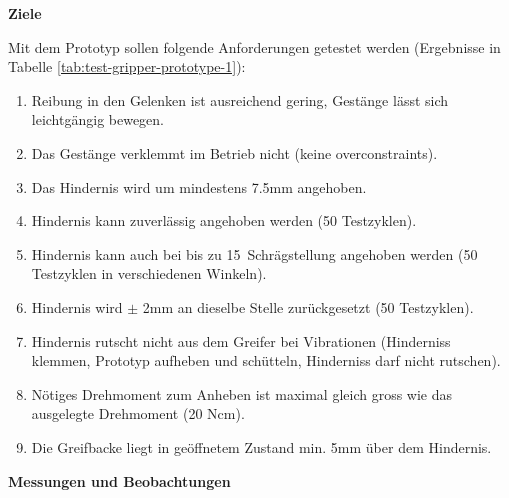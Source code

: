 \textbf{Ziele}

Mit dem Prototyp sollen folgende Anforderungen getestet werden (Ergebnisse in Tabelle \ref{tab:test-gripper-prototype-1}):
\begin{enumerate}
    \item Reibung in den Gelenken ist ausreichend gering, Gestänge lässt sich leichtgängig bewegen.
    \item Das Gestänge verklemmt im Betrieb nicht (keine overconstraints).
    \item Das Hindernis wird um mindestens 7.5mm angehoben.
    \item Hindernis kann zuverlässig angehoben werden (50 Testzyklen).
    \item Hindernis kann auch bei bis zu 15\textdegree\ Schrägstellung angehoben werden (50 Testzyklen in verschiedenen Winkeln).
    \item Hindernis wird $\pm$ 2mm an dieselbe Stelle zurückgesetzt (50 Testzyklen).
    \item Hindernis rutscht nicht aus dem Greifer bei Vibrationen (Hinderniss klemmen, Prototyp aufheben und schütteln, Hinderniss darf nicht rutschen).
    \item Nötiges Drehmoment zum Anheben ist maximal gleich gross wie das ausgelegte Drehmoment (20 Ncm).
    \item Die Greifbacke liegt in geöffnetem Zustand min. 5mm über dem Hindernis.
\end{enumerate}
\newpage

\textbf{Messungen und Beobachtungen}

